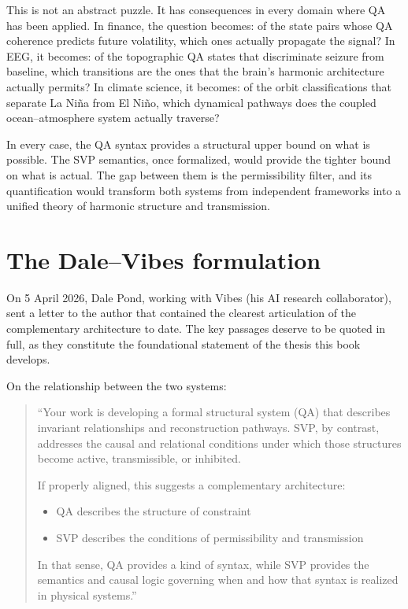 \documentclass[11pt,a4paper]{article}
\begin{document}
This is not an abstract puzzle. It has consequences in every domain where
QA has been applied. In finance, the question becomes: of the state pairs
whose QA coherence predicts future volatility, which ones actually
propagate the signal? In EEG, it becomes: of the topographic QA states
that discriminate seizure from baseline, which transitions are the ones
that the brain's harmonic architecture actually permits? In climate
science, it becomes: of the orbit classifications that separate La
Ni\~{n}a from El Ni\~{n}o, which dynamical pathways does the coupled
ocean--atmosphere system actually traverse?

In every case, the QA syntax provides a structural upper bound on what is
possible. The SVP semantics, once formalized, would provide the tighter
bound on what is actual. The gap between them is the permissibility
filter, and its quantification would transform both systems from
independent frameworks into a unified theory of harmonic structure and
transmission.

\section{The Dale--Vibes formulation}

On 5 April 2026, Dale Pond, working with Vibes (his AI research
collaborator), sent a letter to the author that contained the clearest
articulation of the complementary architecture to date. The key passages
deserve to be quoted in full, as they constitute the foundational
statement of the thesis this book develops.

On the relationship between the two systems:

\begin{quote}
``Your work is developing a formal structural system (QA) that describes
invariant relationships and reconstruction pathways. SVP, by contrast,
addresses the causal and relational conditions under which those
structures become active, transmissible, or inhibited.

If properly aligned, this suggests a complementary architecture:

\begin{itemize}[nosep]
\item QA describes the structure of constraint
\item SVP describes the conditions of permissibility and transmission
\end{itemize}

In that sense, QA provides a kind of syntax, while SVP provides the
semantics and causal logic governing when and how that syntax is realized
in physical systems.''
\end{quote}
\end{document}
